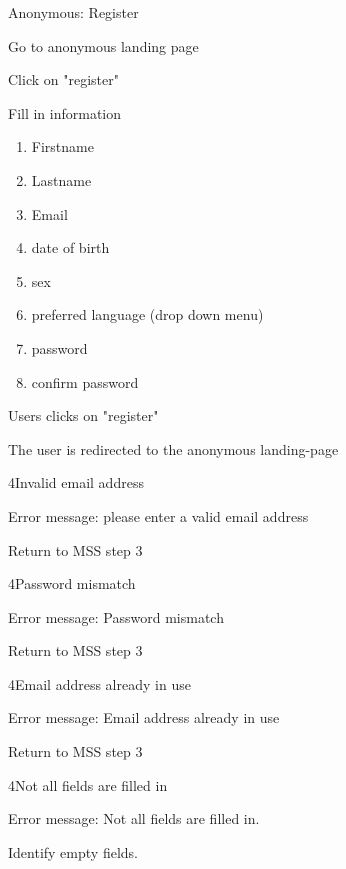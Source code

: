 \begin{uc}{Anonymous: Register}

    \begin{uc-mss}
   	\item Go to anonymous landing page
   	\item Click on "register"
   	\item Fill in information
   	\begin{enumerate}
   	\item Firstname
   	\item Lastname
   	\item Email
   	\item date of birth
   	\item sex
   	\item preferred language (drop down menu)
   	\item password
   	\item confirm password
   	\end{enumerate}
   	\item Users clicks on "register"
   	\item The user is redirected to the anonymous landing-page
    \end{uc-mss}

    \begin{uc-ext}

        \begin{uc-fail}{4}{Invalid email address}
        \item Error message: please enter a valid email address
        \item Return to MSS step 3
        \end{uc-fail}
        
        \begin{uc-fail}{4}{Password mismatch}
        \item Error message: Password mismatch
        \item Return to MSS step 3
		\end{uc-fail}
		
		\begin{uc-fail}{4}{Email address already in use}
		\item Error message: Email address already in use
		\item Return to MSS step 3
		\end{uc-fail}
		
		\begin{uc-fail}{4}{Not all fields are filled in}
		\item Error message: Not all fields are filled in.
		\item Identify empty fields.
		\end{uc-fail}
	\end{uc-ext}
		

\end{uc}
